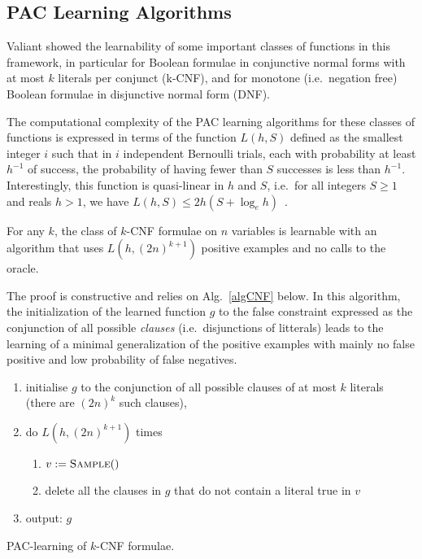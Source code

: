 \documentclass{llncs}
\begin{document}
\subsection{PAC Learning Algorithms}

Valiant showed the learnability of some important classes of functions in this framework,
in particular for Boolean formulae in conjunctive normal forms with at most $k$ literals per conjunct (k-CNF),
and for monotone (i.e.~negation free) Boolean formulae in disjunctive normal form (DNF).

The computational complexity of the PAC learning algorithms for these classes of functions is expressed in terms of the function
$L(h,S)$ defined as the smallest integer $i$ such that
in $i$ independent Bernoulli trials, each with probability at least $h^{-1}$ of success, the probability of having fewer than $S$ successes is less than $h^{-1}$.
Interestingly, this function is quasi-linear in $h$ and $S$, i.e.~for all
integers $S\ge 1$ and reals $h>1$, we have $L(h,S) \le 2h(S+\log_e h)$~\cite{Valiant84cacm}.

\begin{theorem}\label{thm:kcnf}
For any $k$, the class of $k$-CNF formulae on $n$ variables is learnable with an
algorithm that uses $L(h,{(2 n)}^{k+1})$ positive examples and no calls to the
oracle.
\end{theorem}

The proof is constructive and relies on Alg.~\ref{algCNF} below. In this algorithm, the initialization of the learned function $g$ to the false constraint expressed as the conjunction of all possible \emph{clauses} (i.e.~disjunctions of litterals)
leads to the learning of a minimal generalization of the positive examples with mainly no false positive and low probability of false negatives.

\begin{algorithm}
\begin{enumerate}
  \item initialise $g$ to the conjunction of all possible clauses of at most $k$ literals (there are ${(2n)}^k$ such clauses),
\item do $L(h,(2n)^{k+1})$ times 
\begin{enumerate}
\item $v:=\textsc{Sample}()$
\item delete all the clauses in $g$ that do not contain a literal true in $v$
\end{enumerate}
\item output: $g$
\end{enumerate}
\caption{PAC-learning of $k$-CNF formulae.\label{algCNF}}
\end{algorithm}
\end{document}
